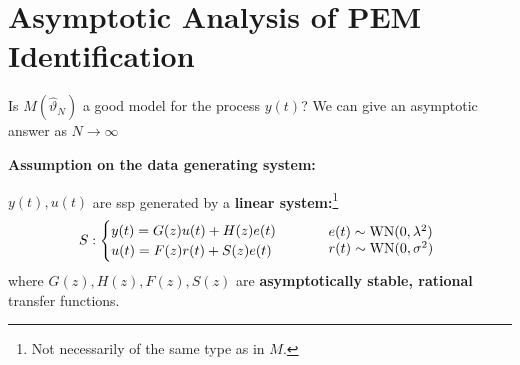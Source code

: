 \section{Asymptotic Analysis of PEM Identification}

Is $M(\hat\vartheta_{N})$ a good model for the process $y(t)$?
We can give an asymptotic answer as $N\to \infty$

\textbf{Assumption on the data generating system:}

$y(t),u(t)$ are \gls{ssp} generated by a \textbf{linear system:}\footnote{Not necessarily of the same type as in $M$.}
\[
	S:
	\begin{cases}
		y(t) = G(z)u(t) + H(z)e(t)\\
		u(t) = F(z)r(t) + S(z)e(t)
	\end{cases}
	\qquad
	\begin{array}{l}
		e(t)\sim \operatorname{WN}(0,\lambda^2)\\
		r(t)\sim \operatorname{WN}(0,\sigma^2)
	\end{array}
\]
where $G(z),H(z),F(z),S(z)$ are \textbf{asymptotically stable, rational} transfer functions.


